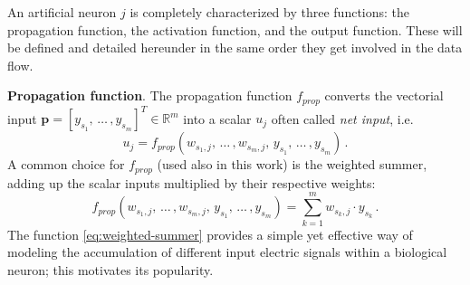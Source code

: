\documentclass[11pt, a4paper]{report}
\numberwithin{equation}{chapter}
\theoremstyle{theorem}
\theoremstyle{definition}
\numberwithin{figure}{section}
\begin{document}
		An artificial neuron $j$ is completely characterized by three functions: the propagation function, the activation function, and the output function. These will be defined and detailed hereunder in the same order they get involved in the data flow. 
		
		\vspace*{0.3cm}
		
		\noindent \textbf{Propagation function}. The propagation function $f_{prop}$ converts the vectorial input $\boldsymbol{p} = [y_{s_1}, \, \ldots \, , y_{s_m}]^T \in \mathbb{R}^m$ into a scalar $u_{j}$ often called \emph{net input}, i.e.
		\begin{equation}
			\label{eq:propagation-function}
			u_{j} = f_{prop}(w_{s_1,j}, \, \ldots \, , w_{s_m,j}, \, y_{s_1}, \, \ldots \, , y_{s_m}) \, .
		\end{equation}
		A common choice for $f_{prop}$ (used also in this work) is the weighted summer, adding up the scalar inputs multiplied by their respective weights:
		\begin{equation}
			\label{eq:weighted-summer}
			f_{prop}(w_{s_1,j}, \, \ldots \, , w_{s_m,j}, \, y_{s_1}, \, \ldots \, , y_{s_m}) = \sum_{k = 1}^m w_{s_k,j} \cdot y_{s_k} \, .
		\end{equation} 
		The function \eqref{eq:weighted-summer} provides a simple yet effective way of modeling the accumulation of different input electric signals within a biological neuron; this motivates its popularity.
		
		\vspace*{0.3cm}
		
\end{document}
